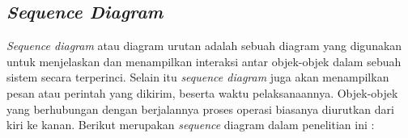 




\subsection{\textit{Sequence Diagram}}
\textit{Sequence diagram} atau diagram urutan adalah sebuah diagram yang digunakan untuk menjelaskan dan menampilkan interaksi antar objek-objek dalam sebuah sistem secara terperinci. Selain itu \textit{sequence diagram} juga akan menampilkan pesan atau perintah yang dikirim, beserta waktu pelaksanaannya. Objek-objek yang berhubungan dengan berjalannya proses operasi biasanya diurutkan dari kiri ke kanan. Berikut merupakan \textit{sequence} diagram dalam penelitian ini :

